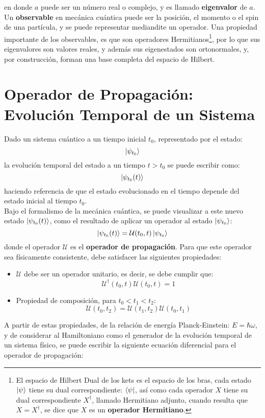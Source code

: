 en donde $a$ puede ser un número real o complejo, y es llamado \textbf{eigenvalor} de $\hat{a}$.
\\
Un \textbf{observable} en mecánica cuántica puede ser la posición, el momento o el spin de una partícula, y se puede representar mediandite un operador. Una propiedad importante de los observables, es que son operadores Hermitianos\footnote{El espacio de Hilbert Dual de los kets es el espacio de los bras, cada estado $\ket{\psi}$ tiene su dual correspondiente: $\bra{\psi}$, así como cada operador $X$ tiene su dual correspondiente $X^\dag$, llamado Hermitiano adjunto, cuando resulta que $X = X^\dag$, se dice que $X$ es un \textbf{operador Hermitiano}.}, por lo que sus eigenvalores son valores reales, y además sus eigenestados son ortonormales, y, por construcción, forman una base completa del espacio de Hilbert.


\section{Operador de Propagación: Evolución Temporal de un Sistema}

Dado un sistema cuántico a un tiempo inicial $t_0$, representado por el estado: $$\ket{\psi_{t_0}}$$ la evolución temporal del estado a un tiempo $t>t_0$ se puede escribir como: $$\ket{\psi_{t_0}(t)}$$ haciendo referencia de que el estado evolucionado en el tiempo depende del estado inicial al tiempo $t_0$.
\\
Bajo el formalismo de la mecánica cuántica, se puede visualizar a este nuevo estado $\ket{\psi_{t_0}(t)}$, como el resultado de aplicar un operador al estado $\ket{\psi_{t_0}}$:
$$\ket{\psi_{t_0}(t)}=\mathcal{U}(t_0,t)\ket{\psi_{t_0}}$$
donde el operador $\mathcal{U}$ es el \textbf{operador de propagación}. Para que este operador sea físicamente consistente, debe satisfacer las siguientes propiedades:

\begin{itemize}[label=\textcolor{CTtitle}{\textbullet}]
\item $\mathcal{U}$ debe ser un operador unitario, es decir, se debe cumplir que: $$\mathcal{U}^\dag(t_0,t)\mathcal{U}(t_0,t)=1$$
\item Propiedad de composición, para $t_0<t_1<t_2$: $$\mathcal{U}(t_0,t_2) = \mathcal{U}(t_1,t_2)\mathcal{U}(t_0,t_1)$$  
\end{itemize}

A partir de estas propiedades, de la relación de energía Planck-Einstein: $E=\hbar\omega$, y de considerar al Hamiltoniano como el generador de la evolución temporal de un sistema físico\cite{Sakurai:1994}, se puede escribir la siguiente ecuación diferencial para el operador de propagación:


